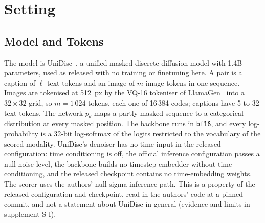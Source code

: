 
\section{Setting}\label{sec:setting}
\subsection{Model and Tokens}\label{sec:setting-model}
The model is UniDisc~\cite{swerdlow2025unidisc}, a unified masked discrete diffusion model with 1.4B parameters, used as released with
no training or finetuning here.
A pair is a caption of $\ell$ text tokens and an image of $m$ image tokens in one sequence.
Images are tokenised at 512~px by the VQ-16 tokeniser of LlamaGen~\cite{sun2024llamagen} into a $32\times32$ grid, so
$m=1\,024$ tokens, each one of 16\,384 codes; captions have 5 to 32 text tokens.
The network $p_\theta$ maps a partly masked sequence to a categorical distribution at every masked position.
The backbone runs in \texttt{bf16}, and every log-probability is a 32-bit log-softmax of the logits restricted to the vocabulary of the
scored modality.
UniDisc's denoiser has no time input in the released configuration: time conditioning is off, the official inference configuration
passes a null noise level, the backbone builds no timestep embedder without time conditioning, and the released checkpoint contains no
time-embedding weights. The scorer uses the authors' null-sigma inference path.
This is a property of the released configuration and checkpoint, read in the authors' code at a pinned commit, and not a statement about
UniDisc in general (evidence and limits in supplement S-I).

